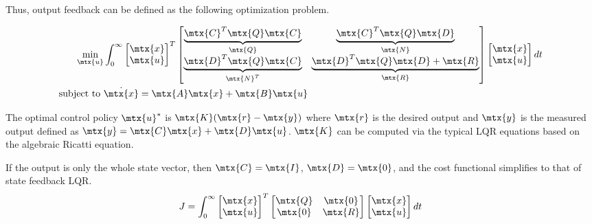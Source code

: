 Thus, output feedback can be defined as the following optimization problem.
\begin{theorem}
  \begin{align}
    \min_{\mtx{u}} &\int_0^\infty
    \begin{bmatrix}
      \mtx{x} \\
      \mtx{u}
    \end{bmatrix}^T
    \begin{bmatrix}
      \underbrace{\mtx{C}^T\mtx{Q}\mtx{C}}_{\mtx{Q}} &
      \underbrace{\mtx{C}^T\mtx{Q}\mtx{D}}_{\mtx{N}} \\
      \underbrace{\mtx{D}^T\mtx{Q}\mtx{C}}_{\mtx{N}^T} &
      \underbrace{\mtx{D}^T\mtx{Q}\mtx{D} + \mtx{R}}_{\mtx{R}}
    \end{bmatrix}
    \begin{bmatrix}
      \mtx{x} \\
      \mtx{u}
    \end{bmatrix}
    dt \nonumber \\
    \text{subject to } &\dot{\mtx{x}} = \mtx{A}\mtx{x} + \mtx{B}\mtx{u}
  \end{align}

  The optimal control policy $\mtx{u}^*$ is $\mtx{K}(\mtx{r} - \mtx{y})$ where
  $\mtx{r}$ is the desired output and $\mtx{y}$ is the measured output defined
  as $\mtx{y} = \mtx{C}\mtx{x} + \mtx{D}\mtx{u}$. $\mtx{K}$ can be computed via
  the typical LQR equations based on the algebraic Ricatti equation.
\end{theorem}

If the output is only the whole state vector, then $\mtx{C} = \mtx{I}$,
$\mtx{D} = \mtx{0}$, and the cost functional simplifies to that of state
feedback LQR.
\begin{equation*}
  J = \int_0^\infty
  \begin{bmatrix}
    \mtx{x} \\
    \mtx{u}
  \end{bmatrix}^T
  \begin{bmatrix}
    \mtx{Q} & \mtx{0} \\
    \mtx{0} & \mtx{R}
  \end{bmatrix}
  \begin{bmatrix}
    \mtx{x} \\
    \mtx{u}
  \end{bmatrix}
  dt
\end{equation*}
